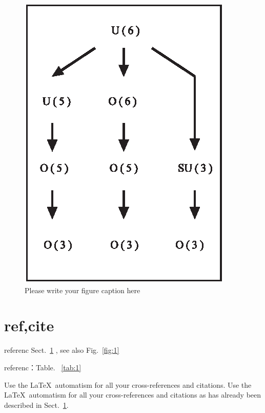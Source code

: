 \begin{figure}[htbp]
\sidecaption[t]
\includegraphics[scale=.65]{figure}
%
%
\caption{Please write your figure caption here}
\label{fig:2}       %
\end{figure}


\section{ref,cite}
\label{sec:2}

referenc Sect.~\ref{sec:2} , see also Fig.~\ref{fig:1}

referenc：Table. ~\ref{tab:1}

\cite{Lipschutz2007}

\cite[chap.2]{Lipschutz2007}


 Use the \LaTeX\ automatism for all your cross-references and citations.
 Use the \LaTeX\ automatism for all your cross-refer\-ences and citations as has already been described in Sect.~\ref{sec:2}.
%


